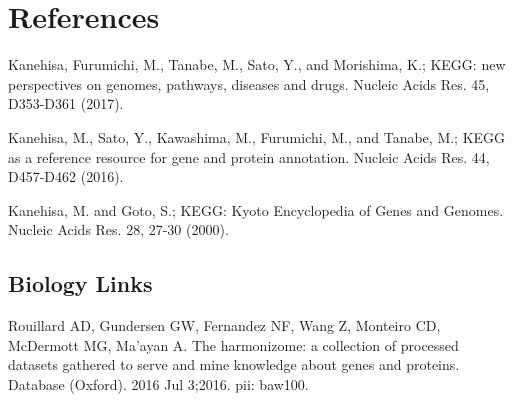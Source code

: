 \section{References}



\begin{thebibliography}{00}

 Kanehisa, Furumichi, M., Tanabe, M., Sato, Y., and Morishima, K.; 
\newblock KEGG: new perspectives on genomes, pathways, diseases and drugs. 
\newblock Nucleic Acids Res. 45, D353-D361 (2017).

 Kanehisa, M., Sato, Y., Kawashima, M., Furumichi, M., and Tanabe, M.; 
\newblock KEGG as a reference resource for gene and protein annotation. 
\newblock Nucleic Acids Res. 44, D457-D462 (2016).

 Kanehisa, M. and Goto, S.; 
\newblock KEGG: Kyoto Encyclopedia of Genes and Genomes. 
\newblock Nucleic Acids Res. 28, 27-30 (2000). 

\subsection{Biology Links}

 Rouillard AD, Gundersen GW, Fernandez NF, Wang Z, Monteiro CD, McDermott MG, Ma'ayan A. 
\newblock The harmonizome: a collection of processed datasets gathered to serve and mine knowledge about genes and proteins. 
\newblock Database (Oxford). 2016 Jul 3;2016. pii: baw100. 


\end{thebibliography}
